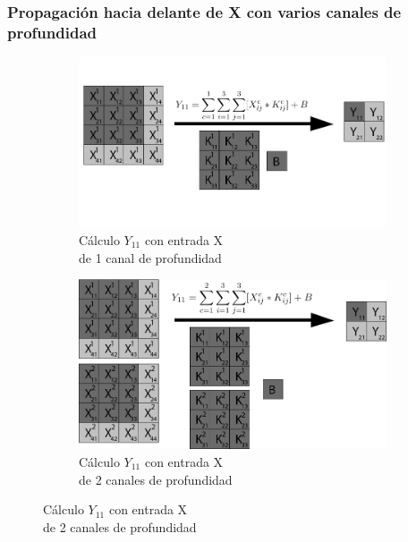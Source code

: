 \subsubsection{Propagación hacia delante de X con varios canales de profundidad}

\begin{figure}[H]
	\centering
	\begin{subfigure}{.5\textwidth}
		\hspace{-10mm}
		\includegraphics[width=1.2\linewidth]{imagenes/conv_1_1canal.jpg}  
		\caption{Cálculo $Y_{11}$ con entrada X \\ de 1 canal de profundidad}
	\end{subfigure}%
	\begin{subfigure}{.5\textwidth}
		\hspace{10mm}
		\includegraphics[width=1.2\linewidth]{imagenes/conv_1_2canales.jpg}  
		\caption{Cálculo $Y_{11}$ con entrada X \\ de 2 canales de profundidad}
	\end{subfigure}
	

\end{figure}
